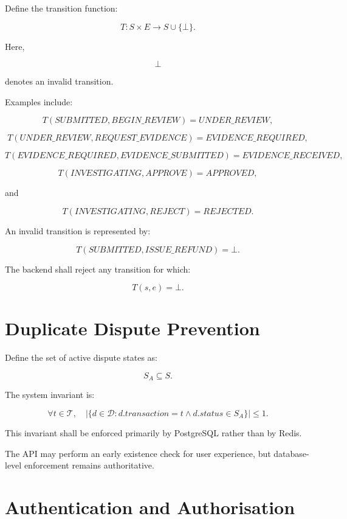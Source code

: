 \documentclass[11pt,a4paper]{article}
\begin{document}
Define the transition function:

\[
T:S\times E\rightarrow S\cup\{\bot\}.
\]

Here,

\[
\bot
\]

denotes an invalid transition.

Examples include:

\[
T(SUBMITTED,BEGIN\_REVIEW)
=
UNDER\_REVIEW,
\]

\[
T(UNDER\_REVIEW,REQUEST\_EVIDENCE)
=
EVIDENCE\_REQUIRED,
\]

\[
T(EVIDENCE\_REQUIRED,EVIDENCE\_SUBMITTED)
=
EVIDENCE\_RECEIVED,
\]

\[
T(INVESTIGATING,APPROVE)
=
APPROVED,
\]

and

\[
T(INVESTIGATING,REJECT)
=
REJECTED.
\]

An invalid transition is represented by:

\[
T(SUBMITTED,ISSUE\_REFUND)
=
\bot.
\]

The backend shall reject any transition for which:

\[
T(s,e)=\bot.
\]

\section{Duplicate Dispute Prevention}

Define the set of active dispute states as:

\[
S_A \subseteq S.
\]

The system invariant is:

\[
\forall t\in\mathcal{T},
\quad
\left|
\{
d\in\mathcal{D}
:
d.transaction=t
\land
d.status\in S_A
\}
\right|
\leq 1.
\]

This invariant shall be enforced primarily by PostgreSQL rather than by
Redis.

The API may perform an early existence check for user experience, but
database-level enforcement remains authoritative.

\section{Authentication and Authorisation}
\end{document}
